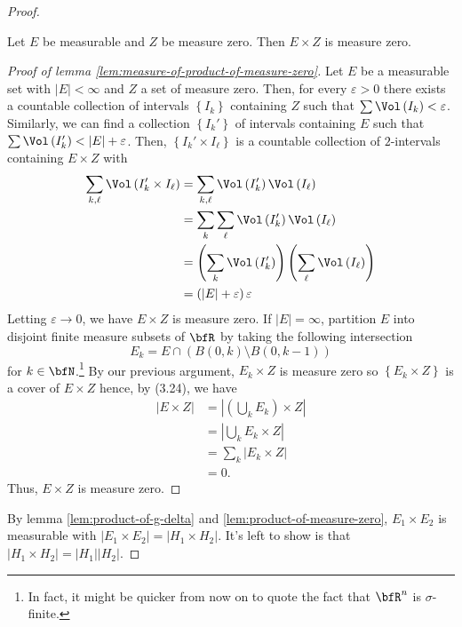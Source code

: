 \begin{proof}
\begin{lemma}
\label{lem:measure-of-product-of-measure-zero}
Let $E$ be measurable and $Z$ be measure zero. Then $E\times Z$ is measure
zero.
\end{lemma}
\begin{proof}[Proof of lemma \ref{lem:measure-of-product-of-measure-zero}]
\renewcommand\qedsymbol{$\clubsuit$}
Let $E$ be a measurable set with $\left|E\right|<\infty$ and $Z$ a set of
measure zero. Then, for every $\varepsilon>0$ there exists a countable
collection of intervals $\left\{I_k\right\}$ containing $Z$ such that
$\sum\Vol\left(I_k\right)<\varepsilon$. Similarly, we can find a collection
$\left\{I_k'\right\}$ of intervals containing $E$ such that
$\sum\Vol\left(I_k'\right)<\left|E\right|+\varepsilon$. Then,
$\left\{I_k'\times I_\ell\right\}$ is a countable collection of
$2$-intervals containing $E\times Z$ with
\begin{align*}
\sum_{k,\ell}\Vol\left(I_k'\times I_\ell\right)
&=\sum_{k,\ell}\Vol\left(I_k'\right)\Vol\left(I_\ell\right)\\
&=\sum_k\sum_\ell\Vol\left(I_k'\right)\Vol\left(I_\ell\right)\\
&=\left(\sum_k\Vol\left(I_k'\right)\right)
\left(\sum_\ell\Vol\left(I_\ell\right)\right)\\
&=\left(\left|E\right|+\varepsilon\right)\varepsilon
\end{align*}
Letting $\varepsilon\to 0$, we have $E\times Z$ is measure zero. If
$\left|E\right|=\infty$, partition $E$ into disjoint finite measure subsets
of $\bfR$ by taking the following intersection
\[
E_k=E\cap\left(B(0,k)\setminus B(0,k-1)\right)
\]
for $k\in\bfN$.\footnote{In fact, it might be quicker from now on to quote
  the fact that $\bfR^n$ is $\sigma$-finite.} By our previous argument,
$E_k\times Z$ is measure zero so $\left\{E_k\times Z\right\}$ is a cover of
$E\times Z$ hence, by (3.24), we have
\begin{align*}
\left|E\times Z\right|
&=\left|\left(\bigcup_k E_k\right)\times Z\right|\\
&=\left|\bigcup_k E_k\times Z\right|\\
&=\sum_k \left|E_k\times Z\right|\\
&=0.
\end{align*}
Thus, $E\times Z$ is measure zero.
\end{proof}

By lemma \ref{lem:product-of-g-delta} and
\ref{lem:product-of-measure-zero}, $E_1\times E_2$ is measurable with
$\left|E_1\times E_2\right|=\left|H_1\times H_2\right|$. It's left to show
is that $\left|H_1\times H_2\right|=\left|H_1\right|\left|H_2\right|$.


\end{proof}
